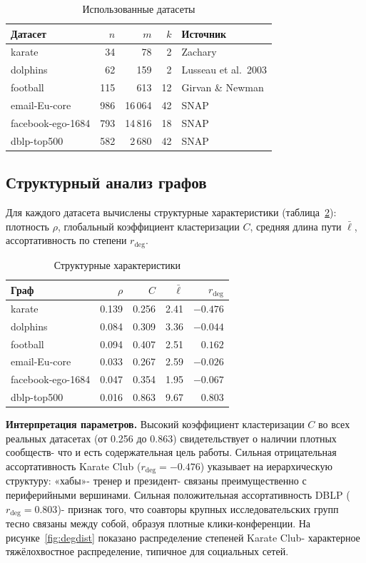 \documentclass[14pt,a4paper]{extarticle}
\begin{document}
\begin{table}[h]
\centering
\begin{tabular}{lrrrl}
\toprule
Датасет & $n$ & $m$ & $k$ & Источник \\
\midrule
karate & 34 & 78 & 2 & Zachary \cite{zachary1977} \\
dolphins & 62 & 159 & 2 & Lusseau et al.\ 2003 \\
football & 115 & 613 & 12 & Girvan \& Newman \cite{girvan2002} \\
email-Eu-core & 986 & 16\,064 & 42 & SNAP \cite{snap} \\
facebook-ego-1684 & 793 & 14\,816 & 18 & SNAP \cite{snap} \\
dblp-top500 & 582 & 2\,680 & 42 & SNAP \cite{snap} \\
\bottomrule
\end{tabular}
\caption{Использованные датасеты}
\label{tab:datasets}
\end{table}

\subsection{Структурный анализ графов}

Для каждого датасета вычислены структурные характеристики (таблица~\ref{tab:struct}): плотность $\rho$, глобальный коэффициент кластеризации $C$, средняя длина пути $\bar\ell$, ассортативность по степени $r_{\deg}$.

\begin{table}[h]
\centering
\begin{tabular}{lrrrr}
\toprule
Граф & $\rho$ & $C$ & $\bar\ell$ & $r_{\deg}$ \\
\midrule
karate & 0.139 & 0.256 & 2.41 & $-0.476$ \\
dolphins & 0.084 & 0.309 & 3.36 & $-0.044$ \\
football & 0.094 & 0.407 & 2.51 & $0.162$ \\
email-Eu-core & 0.033 & 0.267 & 2.59 & $-0.026$ \\
facebook-ego-1684 & 0.047 & 0.354 & 1.95 & $-0.067$ \\
dblp-top500 & 0.016 & 0.863 & 9.67 & $0.803$ \\
\bottomrule
\end{tabular}
\caption{Структурные характеристики}
\label{tab:struct}
\end{table}

\textbf{Интерпретация параметров.} Высокий коэффициент кластеризации $C$ во всех реальных датасетах (от 0.256 до 0.863) свидетельствует о наличии плотных сообществ- что и есть содержательная цель работы. Сильная отрицательная ассортативность Karate Club ($r_{\deg} = -0.476$) указывает на иерархическую структуру: «хабы»- тренер и президент- связаны преимущественно с периферийными вершинами. Сильная положительная ассортативность DBLP ($r_{\deg} = 0.803$)- признак того, что соавторы крупных исследовательских групп тесно связаны между собой, образуя плотные клики-конференции. На рисунке~\ref{fig:degdist} показано распределение степеней Karate Club- характерное тяжёлохвостное распределение, типичное для социальных сетей.
\end{document}
